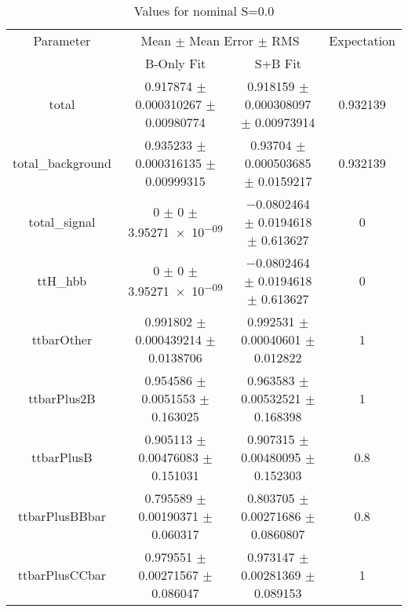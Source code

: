 \begin{table}
\centering
\caption{Values for nominal S=0.0}
\begin{tabular}{cccc}
\toprule
Parameter & \multicolumn{2}{c}{Mean $\pm$ Mean Error $\pm$ RMS} & Expectation\\
 & B-Only Fit & S+B Fit & \\
\midrule
total & \num{0.917874} $\pm$ \num{0.000310267} $\pm$ \num{0.00980774} & \num{0.918159} $\pm$ \num{0.000308097} $\pm$ \num{0.00973914} & \num{0.932139}\\
total\_background & \num{0.935233} $\pm$ \num{0.000316135} $\pm$ \num{0.00999315} & \num{0.93704} $\pm$ \num{0.000503685} $\pm$ \num{0.0159217} & \num{0.932139}\\
total\_signal & \num{0} $\pm$ \num{0} $\pm$ \num{3.95271e-09} & \num{-0.0802464} $\pm$ \num{0.0194618} $\pm$ \num{0.613627} & \num{0}\\
ttH\_hbb & \num{0} $\pm$ \num{0} $\pm$ \num{3.95271e-09} & \num{-0.0802464} $\pm$ \num{0.0194618} $\pm$ \num{0.613627} & \num{0}\\
ttbarOther & \num{0.991802} $\pm$ \num{0.000439214} $\pm$ \num{0.0138706} & \num{0.992531} $\pm$ \num{0.00040601} $\pm$ \num{0.012822} & \num{1}\\
ttbarPlus2B & \num{0.954586} $\pm$ \num{0.0051553} $\pm$ \num{0.163025} & \num{0.963583} $\pm$ \num{0.00532521} $\pm$ \num{0.168398} & \num{1}\\
ttbarPlusB & \num{0.905113} $\pm$ \num{0.00476083} $\pm$ \num{0.151031} & \num{0.907315} $\pm$ \num{0.00480095} $\pm$ \num{0.152303} & \num{0.8}\\
ttbarPlusBBbar & \num{0.795589} $\pm$ \num{0.00190371} $\pm$ \num{0.060317} & \num{0.803705} $\pm$ \num{0.00271686} $\pm$ \num{0.0860807} & \num{0.8}\\
ttbarPlusCCbar & \num{0.979551} $\pm$ \num{0.00271567} $\pm$ \num{0.086047} & \num{0.973147} $\pm$ \num{0.00281369} $\pm$ \num{0.089153} & \num{1}\\
\bottomrule
\end{tabular}
\end{table}